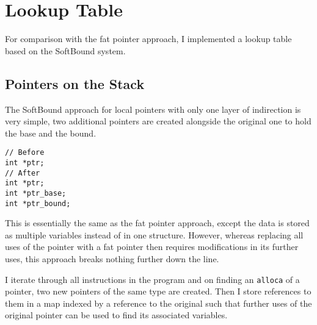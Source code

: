 %
%

\section{Lookup Table}

For comparison with the fat pointer approach, I implemented a lookup table based on the SoftBound system.

\subsection{Pointers on the Stack}

The SoftBound approach for local pointers with only one layer of indirection is very simple, two additional pointers are created alongside the original one to hold the base and the bound.

\begin{verbatim}
// Before
int *ptr;
// After
int *ptr;
int *ptr_base;
int *ptr_bound;
\end{verbatim}

This is essentially the same as the fat pointer approach, except the data is stored as multiple variables instead of in one structure.
However, whereas replacing all uses of the pointer with a fat pointer then requires modifications in its further uses, this approach breaks nothing further down the line.

I iterate through all instructions in the program and on finding an \verb!alloca! of a pointer, two new pointers of the same type are created.
Then I store references to them in a map indexed by a reference to the original such that further uses of the original pointer can be used to find its associated variables.

